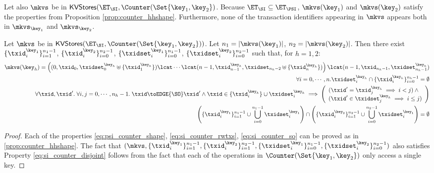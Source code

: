 Let also $\mkvs$ be in $\mathsf{KVStores}(\ET_{\SI}, \Counter(\Set{\key_1, \key_2})$. Because 
$\ET_{\SI} \subseteq \ET_{\PSI}$, $\mkvs(\key_1)$ and $\mkvs(\key_2)$ satisfy the 
properties from Proposition \ref{prop:counter_hhshape}. 
Furthermore, none of the transaction identifiers appearing in $\mkvs$ appears 
both in $\mkvs_{\key_1}$ and $\mkvs_{\key_2}$.
\begin{proposition}
\label{prop:si_counter_hhshape1}
Let $\mkvs$ be in $\mathsf{KVStores}(\ET_{\SI}, \Counter(\Set{\key_1, \key_2}))$. 
Let $n_1 = \lvert \mkvs(\key_1) \rvert$, $n_2 = \lvert \mkvs(\key_2) \rvert$. 
Then there exist $\{\txid_{i}^{\key_1}\}_{i=1}^{n_1 - 1}$, $\{\txid_{i}^{\key_2}\}_{i=0}^{n_2 - 1}$, 
$\{\txidset_{i}^{\key_1}\}_{i=0}^{n_1-1}$, $\{\txidset_{i}^{\key_2}\}_{i=0}^{n_2 - 1}$ such that, 
for $h = 1,2$: 
\begin{align}
\mkvs(\key_{h}) = \left( (0, \txid_{0}, \txidset^{\key_{h}}_{0} \uplus \{\txid^{\key_{h}}_1\}) \lcat \cdots \lcat (n-1, \txid^{\key_{h}}_{n-1}, \txidset_{n_{h}-2} \uplus \{\txid^{\key_{h}}_{n}\}) \right) 
\lcat (n-1, \txid_{n_{h} - 1}, \txidset^{\key_{h}}_{n_{h} - 1}) \label{eq:si_counter_shape}\\
\forall i=0,\cdots,n.\txidset^{\key_{h}}_{i} \cap \{\txid^{\key_{h}}_{i}\}_{i=0}^{n_{h}-1} = \emptyset \label{eq:si_counter_rwtxs}\\
\forall \txid, \txid'.\;\forall i,j=0,\cdots, n_{h} - 1.\; \txid \toEDGE{\SO} \txid' 
\land \txid \in \{\txid^{\key_{h}}_{i}\} \cup \txidset^{\key_{h}}_{i} \implies 
\left(\begin{array}{l}
(\txid' = \txid^{\key_{h}}_{j} \implies i < j) \land {} \\
(\txid' \in \txidset^{\key_{h}}_{j} \implies i \leq j) \\
\end{array}\right) \label{eq:si_counter_so}\\
\left( \{\txid^{\key_{1}}_{i}\}_{i=1}^{n_1 -1} \cup \bigcup_{i=0}^{n_1 - 1} \txidset_{i}^{\key_1} \right) \cap 
\left( \{\txid^{\key_{2}}_{i}\}_{i=1}^{n_2 -1} \cup \bigcup_{i=0}^{n_2 - 1} \txidset_{i}^{\key_1} \right) = \emptyset \label{eq:si_counter_disjoint}
\end{align}

\end{proposition}

\begin{proof}
Each of the properties \eqref{eq:psi_counter_shape}, \eqref{eq:si_counter_rwtxs}, \eqref{eq:si_counter_so} 
can be proved as in \cref{prop:counter_hhshape}. The fact that $(\mkvs, \{\txid_{i}^{\key_{1}}\}_{i=1}^{n_1 - 1}, \{\txid^{\key_2}_{i}\}_{i=1}^{n_2 - 1}, 
\{\txidset_{i}^{\key_1}\}_{i=0}^{n_1 - 1}, \{\txidset_{i}^{\key_2}\}_{i=0}^{n_2-1})$ also satisfies Property \eqref{eq:si_counter_disjoint} 
follows from the fact that each of the operations in $\Counter(\Set{\key_1, \key_2})$ only access a single key. 
\end{proof}


